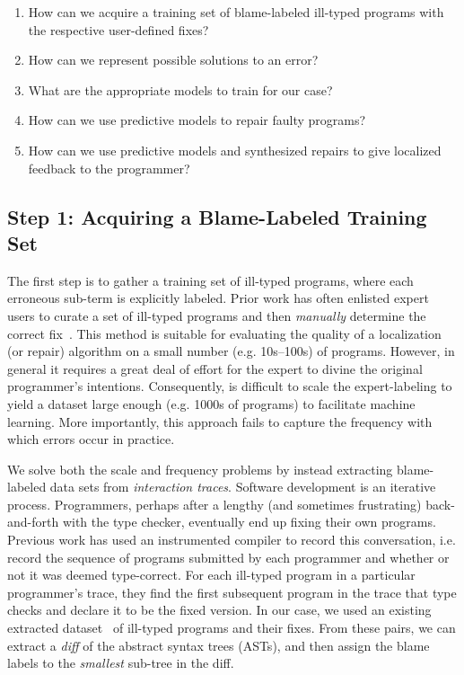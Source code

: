 \begin{enumerate}
  \item How can we acquire a training set of blame-labeled ill-typed programs with the respective user-defined fixes?
  \item How can we represent possible solutions to an error?
  \item What are the appropriate models to train for our case?
  \item How can we use predictive models to repair faulty programs?
  \item How can we use predictive models and synthesized repairs to give localized feedback to the programmer?
\end{enumerate}


\subsection{Step 1: Acquiring a Blame-Labeled Training Set}
\label{subsec:step1}

The first step is to gather a training set of ill-typed programs, where each erroneous sub-term is explicitly labeled.
Prior work has often enlisted expert users to curate a set of ill-typed programs and then \emph{manually} determine the
correct fix~\citep[\eg][]{Lerner2007-dt, Loncaric2016-uk}. This method is suitable for evaluating the quality of a
localization (or repair) algorithm on a small number (e.g. 10s–100s) of programs. However, in general it requires a
great deal of effort for the expert to divine the original programmer’s intentions. Consequently, is difficult to scale
the expert-labeling to yield a dataset large enough (e.g. 1000s of programs) to facilitate machine learning. More
importantly, this approach fails to capture the frequency with which errors occur in practice.

 We solve both the scale and frequency problems by instead extracting blame-labeled data
sets from \emph{interaction traces}. Software development is an iterative process. Programmers, perhaps after a lengthy
(and sometimes frustrating) back-and-forth with the type checker, eventually end up fixing their own programs. Previous
work has used an instrumented \ocaml compiler to record this conversation, i.e. record the sequence of programs
submitted by each programmer and whether or not it was deemed type-correct. For each ill-typed program in a particular
programmer’s trace, they find the first subsequent program in the trace that type checks and declare it to be the fixed
version. In our case, we used an existing extracted dataset~\citep[][]{yunounderstand, Seidel:2017} of ill-typed
programs and their fixes. From these pairs, we can extract a \emph{diff} of the abstract syntax trees (ASTs), and then
assign the blame labels to the \emph{smallest} sub-tree in the diff.

